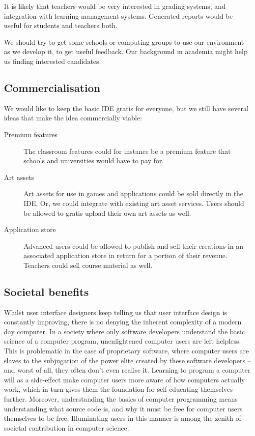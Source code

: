 It is likely that teachers would be very interested in grading systems, and 
integration with learning management systems. Generated reports would be 
useful for students and teachers both.

We should try to get some schools or computing groups to use our environment 
as we develop it, to get useful feedback. Our background in academia might
help us finding interested candidates.

\subsection{Commercialisation}

We would like to keep the basic IDE gratis for everyone, but we still have
several ideas that make the idea commercially viable:

\begin{description}
  \item[Premium features]
    The classroom features could for instance be a premium feature that schools
    and universities would have to pay for.
  \item[Art assets]
    Art assets for use in games and applications could be sold directly in the
    IDE. Or, we could integrate with existing art asset services. Users should 
    be allowed to gratis upload their own art assets as well.
  \item[Application store]
    Advanced users could be allowed to publish and sell their creations in an 
    associated application store in return for a portion of their revenue. 
    Teachers could sell course material as well.
\end{description}

\subsection{Societal benefits}
Whilst user interface designers keep telling us that user interface design is 
constantly improving, there is no denying the inherent complexity of a modern 
day computer. In a society where only software developers understand the basic 
science of a computer program, unenlightened computer users are left helpless. 
This is problematic in the case of proprietary software, where computer users 
are slaves to the subjugation of the power elite created by these software 
developers -- and worst of all, they often don't even realise it. Learning to 
program a computer will as a side-effect make computer users more aware of how 
computers actually work, which in turn gives them the foundation for 
self-educating themselves further. Moreover, understanding the basics of 
computer programming means understanding what source code is, and why it must 
be free for computer users themselves to be free. Illuminating users in this 
manner is among the zenith of societal contribution in computer science.

